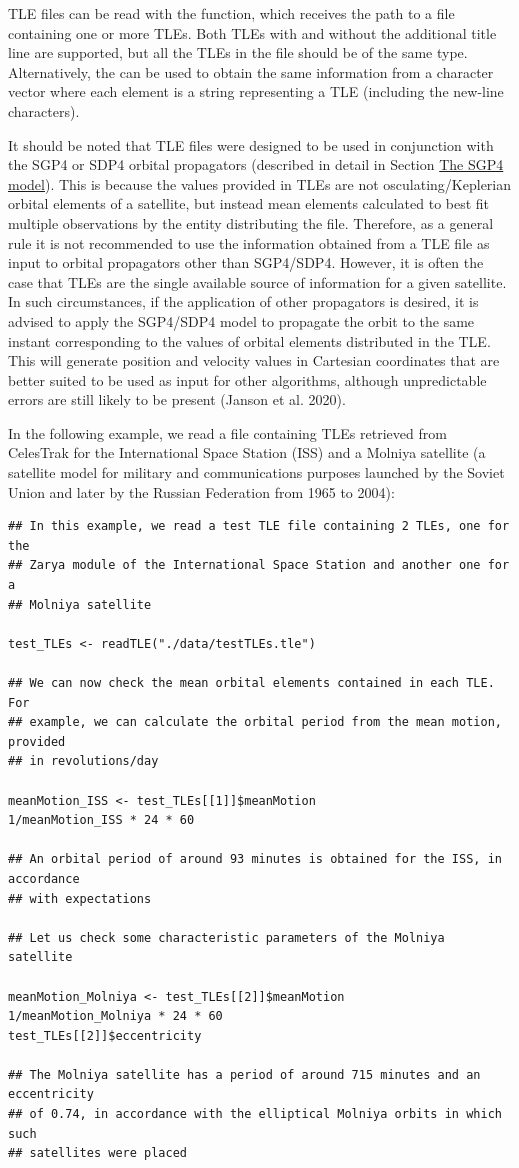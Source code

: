 TLE files can be read with the  function, which receives the path to a file containing one or more TLEs. Both TLEs with and without the additional title line are supported, but all the TLEs in the file should be of the same type. Alternatively, the  can be used to obtain the same information from a character vector where each element is a string representing a TLE (including the new-line characters).

It should be noted that TLE files were designed to be used in conjunction with the SGP4 or SDP4 orbital propagators (described in detail in Section \protect\hyperlink{the-sgp4-model}{The SGP4 model}). This is because the values provided in TLEs are not osculating/Keplerian orbital elements of a satellite, but instead mean elements calculated to best fit multiple observations by the entity distributing the file. Therefore, as a general rule it is not recommended to use the information obtained from a TLE file as input to orbital propagators other than SGP4/SDP4. However, it is often the case that TLEs are the single available source of information for a given satellite. In such circumstances, if the application of other propagators is desired, it is advised to apply the SGP4/SDP4 model to propagate the orbit to the same instant corresponding to the values of orbital elements distributed in the TLE. This will generate position and velocity values in Cartesian coordinates that are better suited to be used as input for other algorithms, although unpredictable errors are still likely to be present (Janson et al. 2020).

In the following example, we read a file containing TLEs retrieved from CelesTrak for the International Space Station (ISS) and a Molniya satellite (a satellite model for military and communications purposes launched by the Soviet Union and later by the Russian Federation from 1965 to 2004):

\begin{verbatim}
## In this example, we read a test TLE file containing 2 TLEs, one for the
## Zarya module of the International Space Station and another one for a
## Molniya satellite

test_TLEs <- readTLE("./data/testTLEs.tle")

## We can now check the mean orbital elements contained in each TLE. For 
## example, we can calculate the orbital period from the mean motion, provided 
## in revolutions/day

meanMotion_ISS <- test_TLEs[[1]]$meanMotion
1/meanMotion_ISS * 24 * 60

## An orbital period of around 93 minutes is obtained for the ISS, in accordance
## with expectations

## Let us check some characteristic parameters of the Molniya satellite

meanMotion_Molniya <- test_TLEs[[2]]$meanMotion
1/meanMotion_Molniya * 24 * 60
test_TLEs[[2]]$eccentricity

## The Molniya satellite has a period of around 715 minutes and an eccentricity
## of 0.74, in accordance with the elliptical Molniya orbits in which such
## satellites were placed
\end{verbatim}

